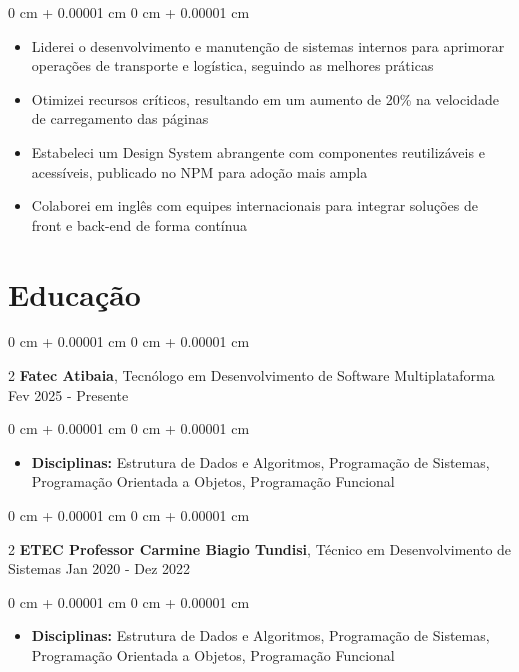 \documentclass[10pt, letterpaper]{article}
\newenvironment{highlights}{ \begin{itemize}[ topsep=0.10 cm, parsep=0.10 cm, partopsep=0pt,
itemsep=0pt, leftmargin=0 cm + 10pt ] }{ \end{itemize} } %
\newenvironment{onecolentry}{ \begin{adjustwidth}{ 0 cm + 0.00001 cm }{ 0 cm + 0.00001 cm }
}{ \end{adjustwidth} } %
\newenvironment{twocolentry}[2][]{ \onecolentry \def\secondColumn{#2} \setcolumnwidth{\fill, 4.5 cm}
\begin{paracol}{2} }{ \switchcolumn \raggedleft \secondColumn \end{paracol}
\endonecolentry } %
\begin{document}
	\vspace{0.10 cm}
	\begin{onecolentry}
		\begin{highlights}
			\item Liderei o desenvolvimento e manutenção de sistemas internos para aprimorar operações de transporte e logística, seguindo as melhores práticas
			\item Otimizei recursos críticos, resultando em um aumento de 20\% na velocidade de carregamento das páginas
			\item Estabeleci um Design System abrangente com componentes reutilizáveis e acessíveis, publicado no NPM para adoção mais ampla
			\item Colaborei em inglês com equipes internacionais para integrar soluções de front e back-end de forma contínua
		\end{highlights}
	\end{onecolentry}
	
	\section{Educação}

	\begin{twocolentry}
		{ Fev 2025 - Presente } \textbf{Fatec Atibaia}, Tecnólogo em Desenvolvimento de Software Multiplataforma
	\end{twocolentry}
	
	\vspace{0.10 cm}
	\begin{onecolentry}
		\begin{highlights}
			\item \textbf{Disciplinas:} Estrutura de Dados e Algoritmos, Programação de Sistemas,
			Programação Orientada a Objetos, Programação Funcional
		\end{highlights}
	\end{onecolentry}
	
	\begin{twocolentry}
		{ Jan 2020 - Dez 2022 } \textbf{ETEC Professor Carmine Biagio Tundisi}, Técnico em
		Desenvolvimento de Sistemas
	\end{twocolentry}
	
	\vspace{0.10 cm}
	\begin{onecolentry}
		\begin{highlights}
			\item \textbf{Disciplinas:} Estrutura de Dados e Algoritmos, Programação de Sistemas,
			Programação Orientada a Objetos, Programação Funcional
		\end{highlights}
	\end{onecolentry}
	
\end{document}
